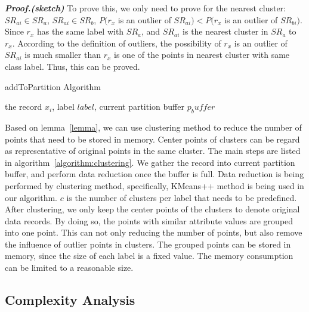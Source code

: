\documentclass[runningheads]{llncs}
\begin{document}
	\textbf{\textit{Proof.(sketch)}} 
	To prove this, we only need to prove for the nearest cluster: $SR_{ai} \in SR_a$, $SR_{ai} \in SR_b$, $P(r_x$ is an outlier of $SR_{ai}) < P(r_x$ is an outlier of $SR_{bi})$. Since $r_x$ has the same label with $SR_a$, and $SR_{ai}$ is the nearest cluster in $SR_a$ to $r_x$. According to the definition of outliers, the possibility of $r_x$ is an outlier of $SR_{ai}$ is much smaller than $r_x$ is one of the points in nearest cluster with same class label. Thus, this can be proved.
	
	\begin{algorithm}
		\caption{addToPartition Algorithm} \label{algorithm:clustering}
		\begin{algorithmic}
			\REQUIRE the record $x_i$, label $label$, current partition buffer $p_buffer$
			\ELSE 
			\ENDFOR
			\ENDIF
		\end{algorithmic}
	\end{algorithm}
	
	Based on lemma~\ref{lemma}, we can use clustering method to reduce the number of points that need to be stored in memory. Center points of clusters can be regard as representative of original points in the same cluster. The main steps are listed in algorithm~\ref{algorithm:clustering}. We gather the record into current partition buffer, and perform data reduction once the buffer is full. Data reduction is being performed by clustering method, specifically, KMeans++\cite{Arthur} method is being used in our algorithm. $c$ is the number of clusters per label that needs to be predefined. After clustering, we only keep the center points of the clusters to denote original data records. By doing so, the points with similar attribute values are grouped into one point. This can not only reducing the number of points, but also remove the influence of outlier points in clusters. The grouped points can be stored in memory, since the size of each label is a fixed value. The memory consumption can be limited to a reasonable size. 
	
	\subsection{Complexity Analysis}
	
\end{document}
